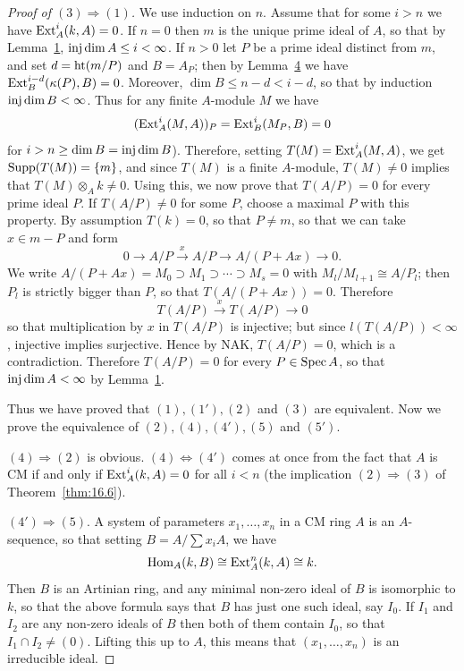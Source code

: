 \begin{proof}[Proof of $(3) \Rightarrow (1)$]
We use induction on $n$. Assume that for some $i > n$ we have
$\operatorname{Ext}^i_A(k, A) = 0$. If $n = 0$ then $m$ is the unique prime ideal of $A$, so that by
Lemma~\hyperref[lem:18.1]{1}, $\operatorname{inj\,dim} A \le i < \infty$. If $n > 0$ let $P$ be a prime ideal distinct
from $m$, and set $d = \operatorname{ht} (m/P)$ and $B = A_P$; then by Lemma~\hyperref[lem:18.4]{4} we have
$\operatorname{Ext}^{i-d}_B(\kappa(P), B) = 0$. Moreover, $\dim B \le n - d < i - d$, so that by induction
$\operatorname{inj\,dim} B < \infty$. Thus for any finite $A$-module $M$ we have
\[
  (\operatorname{Ext}^i_A(M, A))_P = \operatorname{Ext}^i_B(M_P, B) = 0
\]
for $i > n \ge \dim B = \operatorname{inj\,dim} B$). Therefore, setting $T(M) = \operatorname{Ext}^i_A(M, A)$,
we get $\operatorname{Supp}(T(M)) = \{m\}$, and since $T(M)$ is a finite $A$-module,
$T(M) \neq 0$ implies that $T(M) \otimes_A k \neq 0$. Using this, we now prove that $T(A/P) = 0$ for every prime
ideal $P$. If $T(A/P) \neq 0$ for some $P$, choose a maximal $P$ with this property. By
assumption $T(k) = 0$, so that $P \neq m$, so that we can take $x \in m - P$ and form
\[
  0 \to A/P \xrightarrow{x} A/P \to A/(P + Ax) \to 0.
\]
We write $A/(P + Ax) = M_0 \supset M_1 \supset \cdots \supset M_s = 0$ with $M_l/M_{l+1} \cong A/P_l$;
then $P_l$ is strictly bigger than $P$, so that $T(A/(P + Ax)) = 0$. Therefore
\[
  T(A/P) \xrightarrow{x} T(A/P) \to 0
\]
so that multiplication by $x$ in $T(A/P)$ is injective; but since
$l(T(A/P)) < \infty$, injective implies surjective. Hence by NAK, $T(A/P) = 0$,
which is a contradiction. Therefore $T(A/P) = 0$ for every $P \in \operatorname{Spec} A$, so that
$\operatorname{inj\,dim} A < \infty$ by Lemma~\hyperref[lem:18.1]{1}.

Thus we have proved that $(1), (1'), (2)$ and $(3)$ are equivalent. Now we
prove the equivalence of $(2), (4), (4'), (5)$ and $(5')$.

$(4) \Rightarrow (2)$ is obvious. $(4) \Leftrightarrow (4')$ comes at once from the fact that $A$ is CM if and
only if $\operatorname{Ext}^i_A(k, A) = 0$ for all $i < n$ (the implication $(2) \Rightarrow (3)$ of
Theorem~\ref{thm:16.6}).

$(4') \Rightarrow (5)$. A system of parameters $x_1, \ldots, x_n$ in a CM ring $A$ is an $A$-
sequence, so that setting $B = A/\sum x_iA$, we have
\[
  \operatorname{Hom}_A(k, B) \cong \operatorname{Ext}^n_A(k, A) \cong k.
\]
Then $B$ is an Artinian ring, and any minimal non-zero ideal of $B$ is
isomorphic to $k$, so that the above formula says that $B$ has just one such
ideal, say $I_0$. If $I_1$ and $I_2$ are any non-zero ideals of $B$ then both of
them contain $I_0$, so that $I_1 \cap I_2 \neq (0)$. Lifting this up to $A$, this means
that $(x_1, \ldots, x_n)$ is an irreducible ideal.


\end{proof}

